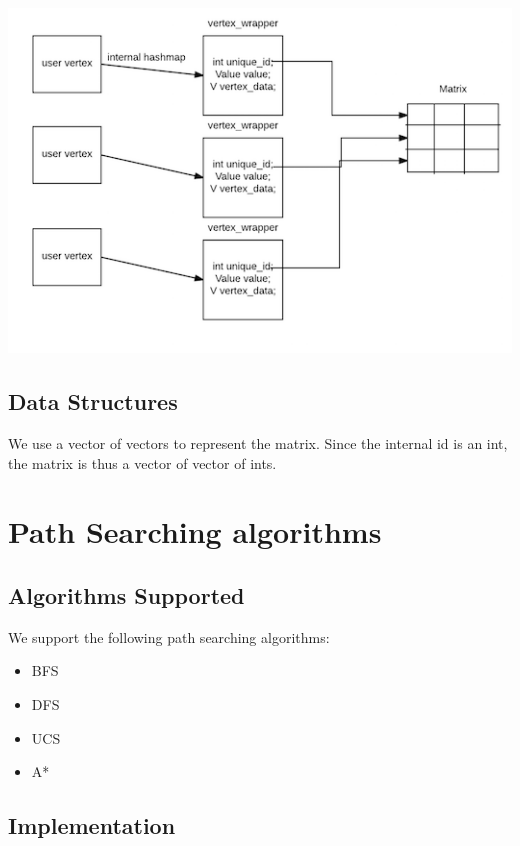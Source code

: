 \documentclass{article}
\begin{document}
\includegraphics{matrix}

\subsection{Data Structures}
We use a vector of vectors to represent the matrix. Since the internal id is an int, the matrix is thus a vector of vector of ints. 

\section{Path Searching algorithms}
\subsection{Algorithms Supported}
We support the following path searching algorithms: 
\begin{itemize}
\item BFS
\item DFS
\item UCS
\item A*
\end{itemize}

\subsection{Implementation}
\end{document}
